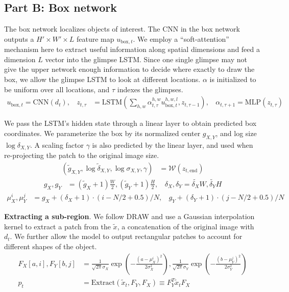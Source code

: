 \subsection{Part B: Box network}

The box network localizes objects of interest. The CNN in the box network
outputs a $H' \times W' \times L$ feature map $u_{\text{box}, t}$. We employ a
``soft-attention'' mechanism here to extract useful information along spatial
dimensions and feed a dimension $L$ vector into the glimpse LSTM. Since one
single glimpse may not give the upper network enough information to decide
where exactly to draw the box, we allow the glimpse LSTM to look at different
locations.  $\alpha$ is  initialized to be uniform over all locations, and
$\tau$ indexes the glimpses.
\vspace{-1pt}
\begin{align}
u_{\text{box},t} = \text{CNN}(d_t), \ \ \ \
z_{t, \tau} &= \text{LSTM} (
\sum_{h, w} \alpha^{h, w}_{t, \tau} u^{h,w,l}_{\text{box},t}, z_{t, \tau-1} ), \ \ \ \
\alpha_{t, \tau+1} = \text{MLP}(z_{t, \tau})
\end{align}
\vspace{-6pt}

We pass the LSTM's hidden state through a linear layer to obtain predicted
box coordinates. We parameterize the box by its normalized center
$g_{X,Y}$, and log size $\log \delta_{X,Y}$. A scaling factor $\gamma$ is
also predicted by the linear layer, and used when re-projecting the patch
to the original image size.
\vspace{-1pt}
\begin{align}
(\tilde{g}_{X,Y}, \log \tilde{\delta}_{X,Y}, \log \sigma_{X,Y}, \gamma) &= \mathcal{W}(z_{t, \text{end}})
\end{align}
\begin{align}
g_X, g_Y &= (\tilde{g}_X+1)\frac{W}{2}, (\tilde{g}_Y+1)\frac{H}{2}, \ \ \ \ 
\delta_X, \delta_Y = \tilde{\delta_X} W, \tilde{\delta_Y} H
\end{align}
\vspace{-6pt}
\begin{align}
\mu_X^i, \mu_Y^j &= g_X + (\delta_X + 1) \cdot (i - N / 2 + 0.5) / N, \ \ \ \  
g_Y + (\delta_Y + 1) \cdot (j - N / 2 + 0.5) / N
\end{align}

\textbf{Extracting a sub-region}. We follow DRAW \cite{gregor15draw} and use a
Gaussian interpolation kernel to extract a patch from the $\tilde{x}$, a
concatenation of the original image with $d_t$. We further allow the model to
output rectangular patches to account for different shapes of the object.
\begin{align}
F_X[a, i], F_Y[b, j] &= 
\frac{1}{\sqrt{2\pi} \sigma_X} \exp \left(- \frac{(a -
\mu_X^i)^2}{2\sigma_X^2} \right), 
\frac{1}{\sqrt{2\pi} \sigma_Y} \exp \left(- \frac{(b -
\mu_Y^j)^2}{2\sigma_Y^2} \right) \\
p_t &= \text{Extract}(\tilde{x}_t, F_Y, F_X) \equiv F_Y^T \tilde{x}_t F_X
\end{align}


